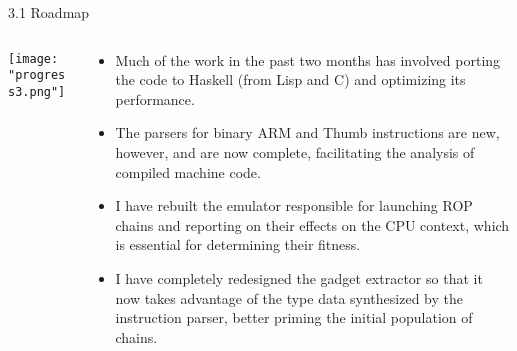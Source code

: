 \documentclass[9pt]{beamer}
\begin{document}
\begin{frame}{3.1 Roadmap}
\begin{columns}

\begin{column}{.4\textwidth}
\begin{center}
\texttt{[image: "progress3.png"]}
\end{center}
\end{column}

\begin{column}{.6\textwidth}
\begin{itemize}\small
\item Much of the work in the past two months has involved porting the code to Haskell (from Lisp and C) and optimizing its performance.

\item The parsers for binary ARM and Thumb instructions are new, however, and are now complete, facilitating the analysis of compiled machine code.

\item I have rebuilt the emulator responsible for launching ROP chains and reporting on their effects on the CPU context, which is essential for determining their fitness.

\item I have completely redesigned the gadget extractor so that it now takes advantage of the type data synthesized by the instruction parser, better priming the initial population of chains.

\end{itemize}
\end{column}

\end{columns}
\end{frame}
\end{document}

